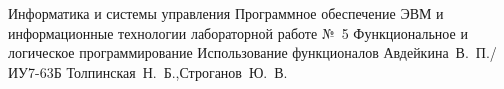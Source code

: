\documentclass{bmstu}
\begin{document}
	\makereporttitle
	{Информатика и системы управления} %
	{Программное обеспечение ЭВМ и информационные технологии} %
	{лабораторной работе №~5} %
	{Функциональное и логическое программирование} %
	{Использование функционалов} %
	{} %
	{Авдейкина~В.~П./ИУ7-63Б} %
	{Толпинская~Н.~Б.,Строганов~Ю.~В.} %
\end{document}
